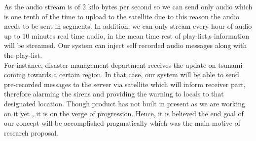 As the audio stream is of 2 kilo bytes per second  so we can send only audio which is one tenth of the time  to upload to the satellite due to this reason the audio needs to be sent in segments. In addition, we can only stream every hour of audio up to 10 minutes real time audio, in the mean time rest of  play-list,s information will be streamed. Our system can inject self recorded audio messages along with the play-list.\\

For instance, disaster management department receives the update on tsunami coming towards a certain region. In that case, our system will be able to send pre-recorded messages to the server via satellite which will inform receiver part, therefore alarming the sirens and providing the warning to locals to that designated location. Though product has not built in present as we are working on it yet , it is on the verge of progression. Hence, it is believed the end goal of our concept will be accomplished pragmatically which was the main motive of research proposal.

	